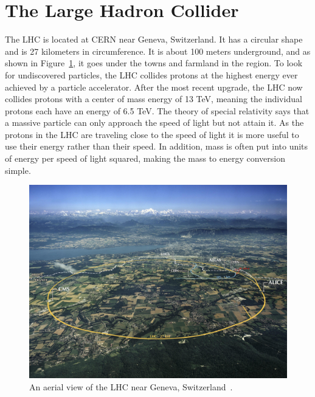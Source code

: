 
\section{The Large Hadron Collider}

The LHC is located at CERN near Geneva, Switzerland. It has a circular shape and is 27 kilometers in circumference. It is about 100 meters underground, and as shown in Figure~\ref{fig:LHC}, it goes under the towns and farmland in the region. To look for undiscovered particles, the LHC collides protons at the highest energy ever achieved by a particle accelerator. After the most recent upgrade, the LHC now collides protons with a center of mass energy of 13 TeV, meaning the individual protons each have an energy of 6.5 TeV. The theory of special relativity says that a massive particle can only approach the speed of light but not attain it. As the protons in the LHC are traveling close to the speed of light it is more useful to use their energy rather than their speed. In addition, mass is often put into units of energy per speed of light squared, making the mass to energy conversion simple. 

\begin{figure}
\centering
\includegraphics[width=0.8\linewidth]{Figures/LHC.jpg}
\caption{An aerial view of the LHC near Geneva, Switzerland~\cite{LHC_view}.}
\label{fig:LHC}
\end{figure}

